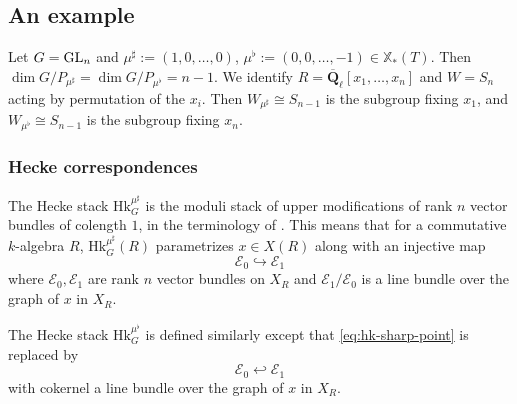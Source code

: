\documentclass[reqno]{amsart}
\numberwithin{equation}{subsection}
\newtheorem{conj}[subsubsection]{Conjecture}
\theoremstyle{definition}
\newcommand\cE{\mathcal{E}}
\newcommand\cL{\mathcal{L}}
\newcommand{\sL}{{\mathscr{L}}}
\newcommand{\Gr}{\textup{Gr}}
\newcommand\Hk{\mathrm{Hk}}
\newcommand\Sht{\textup{Sht}}
\newcommand\GL{\textup{GL}}
\newcommand\xcoch{\mathbb{X}_*}
\newcommand{\Qlbar}{\overline{\Q}_\ell}
\newcommand\D\Delta
\newcommand{\e}{\epsilon}
\newcommand{\z}{\zeta}
\renewcommand{\l}{\lambda}
\newcommand\sh{\sharp}
\newcommand{\inj}{\hookrightarrow}
\newcommand{\Q}{\mathbf{Q}}
\begin{document}
 
%


\subsection{An example}\label{ssec:gln-colength-one-arithmetic-volume}

Let $G = \GL_n$ and $\mu^\sharp := (1,0, \ldots, 0)$, $\mu^\flat := (0, 0, \ldots, -1) \in \xcoch(T)$. Then $\dim G/P_{\mu^{\sh}} = \dim G/P_{\mu^{\flat}}  =  n-1$. We identify $R = \Qlbar[x_1, \ldots, x_n]$ and $W  = S_n$ acting by permutation of the $x_i$. Then $W_{\mu^\sharp} \cong S_{n-1}$ is the subgroup fixing $x_1$, and $W_{\mu^\flat} \cong S_{n-1}$ is the subgroup fixing $x_n$. 



\subsubsection{Hecke correspondences} The Hecke stack $\Hk^{\mu^\sharp}_G$ is the moduli stack of upper modifications of rank $n$ vector bundles of colength $1$, in the terminology of \cite[Definition 6.5]{FYZ}. This means that for a commutative $k$-algebra $R$, $\Hk^{\mu^\sharp}_G(R)$ parametrizes $x \in X(R)$ along with an injective map 
\begin{equation}\label{eq:hk-sharp-point}
\cE_{0} \inj \cE_1 
\end{equation}
where $\cE_0, \cE_1$ are rank $n$ vector bundles on $X_R$ and $\cE_1/\cE_0$ is a line bundle over the graph of $x$ in $X_R$. 

The Hecke stack $\Hk^{\mu^\flat}_G$ is defined similarly except that \eqref{eq:hk-sharp-point} is replaced by 
\begin{equation}\label{eq:hk-flat-point}
\cE_{0} \hookleftarrow \cE_1 
\end{equation}
with cokernel a line bundle over the graph of $x$ in $X_R$. 
\end{document}
